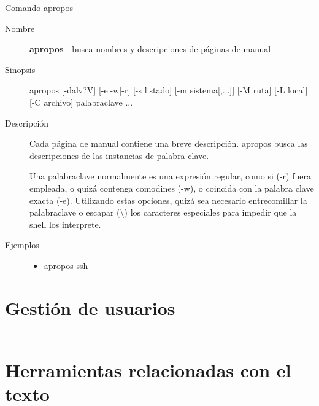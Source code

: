 \begin{frame}[c]{Comando apropos}
  \begin{description}
    \item[Nombre]
      \textbf{apropos} - busca nombres y descripciones de páginas de manual

    \vspace{\baselineskip}
    \item[Sinopsis]
      apropos [-dalv?V] [-e|-w|-r] [-s listado] [-m sistema[,...]] [-M ruta] [-L local] [-C archivo] palabraclave ...

    \vspace{\baselineskip}
    \item[Descripción]
      Cada página de manual contiene una breve descripción.
      apropos busca las descripciones de las instancias de palabra clave.

      Una palabraclave normalmente es una expresión regular, como si (-r)
      fuera empleada, o quizá contenga comodines (-w), o coincida con la
      palabra clave exacta (-e). Utilizando estas opciones, quizá sea
      necesario entrecomillar la palabraclave o escapar (\textbackslash{})
      los caracteres especiales para impedir que la shell los interprete.

    \vspace{\baselineskip}
    \item[Ejemplos]
      \begin{itemize}
        \item apropos ssh
      \end{itemize}
  \end{description}
\end{frame}


\section{Gestión de usuarios}

\begin{frame}[c]{}
\end{frame}

\begin{frame}[fragile]
  \frametitle{}

  \begin{lstlisting}[language=Bash]
  \end{lstlisting}
\end{frame}

\section{Herramientas relacionadas con el texto}

